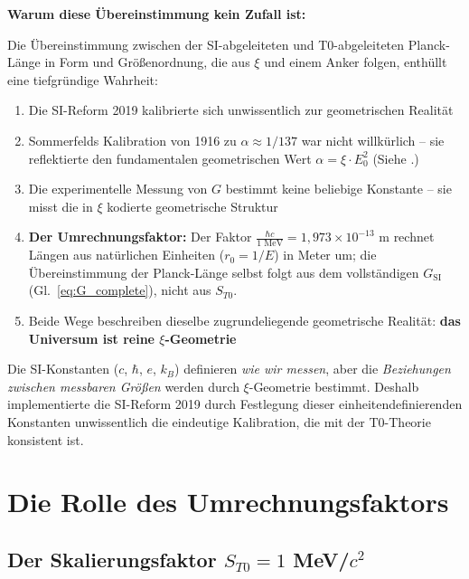 	\begin{warning}
		\textbf{Warum diese Übereinstimmung kein Zufall ist:}
		
		Die Übereinstimmung zwischen der SI-abgeleiteten und T0-abgeleiteten Planck-Länge in Form und Größenordnung, die aus $\xi$ und einem Anker folgen, enthüllt eine tiefgründige Wahrheit:
		
		\begin{enumerate}
			\item Die SI-Reform 2019 kalibrierte sich unwissentlich zur geometrischen Realität
			
			\item Sommerfelds Kalibration von 1916 zu $\alpha \approx 1/137$ war nicht willkürlich -- sie reflektierte den fundamentalen geometrischen Wert $\alpha = \xi \cdot E_0^2$ (Siehe \cite{T0_Feinstruktur_De}.)
			
			\item Die experimentelle Messung von $G$ bestimmt keine beliebige Konstante -- sie misst die in $\xi$ kodierte geometrische Struktur
			
			\item \textbf{Der Umrechnungsfaktor:} Der Faktor $\frac{\hbar c}{1 \text{ MeV}} = 1{,}973 \times 10^{-13}$ m rechnet Längen aus natürlichen Einheiten ($r_0 = 1/E$) in Meter um; die Übereinstimmung der Planck-Länge selbst folgt aus dem vollständigen $G_{\text{SI}}$ (Gl.~\eqref{eq:G_complete}), nicht aus $S_{T0}$.
			
			\item Beide Wege beschreiben dieselbe zugrundeliegende geometrische Realität: \textbf{das Universum ist reine $\xi$-Geometrie}
		\end{enumerate}
		
		Die SI-Konstanten ($c$, $\hbar$, $e$, $k_B$) definieren \emph{wie wir messen}, aber die \emph{Beziehungen zwischen messbaren Größen} werden durch $\xi$-Geometrie bestimmt. Deshalb implementierte die SI-Reform 2019 durch Festlegung dieser einheitendefinierenden Konstanten unwissentlich die eindeutige Kalibration, die mit der T0-Theorie konsistent ist.
	\end{warning}
	
	\section{Die Rolle des Umrechnungsfaktors}
	
	\subsection{Der Skalierungsfaktor $S_{T0} = 1$ MeV/$c^2$}
	
